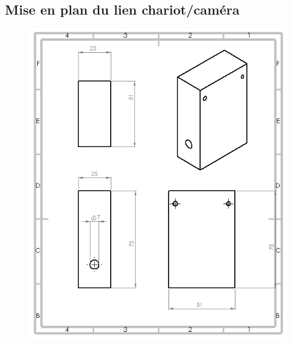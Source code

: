 \begin{changemargin}{-2cm}{-4cm}
\chapter*{Mise en plan du lien chariot/caméra}
\begin{figure}[!h]
 \center
 \includegraphics[scale=0.95]{../3Dmodels/camerachariot.png}
\end{figure}


\end{changemargin}
